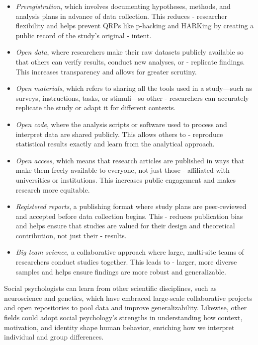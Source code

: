 \documentclass[
  letterpaper,
]{book}
\providecommand{\tightlist}{%
  \setlength{\itemsep}{0pt}\setlength{\parskip}{0pt}}\usepackage{longtable,booktabs,array}
\begin{document}
\begin{itemize}
\tightlist
\item
  \emph{Preregistration}, which involves documenting hypotheses,
  methods, and analysis plans in advance of data collection. This
  reduces - researcher flexibility and helps prevent QRPs like p-hacking
  and HARKing by creating a public record of the study's original -
  intent.
\item
  \emph{Open data}, where researchers make their raw datasets publicly
  available so that others can verify results, conduct new analyses, or
  - replicate findings. This increases transparency and allows for
  greater scrutiny.
\item
  \emph{Open materials}, which refers to sharing all the tools used in a
  study---such as surveys, instructions, tasks, or stimuli---so other -
  researchers can accurately replicate the study or adapt it for
  different contexts.
\item
  \emph{Open code}, where the analysis scripts or software used to
  process and interpret data are shared publicly. This allows others to
  - reproduce statistical results exactly and learn from the analytical
  approach.
\item
  \emph{Open access}, which means that research articles are published
  in ways that make them freely available to everyone, not just those -
  affiliated with universities or institutions. This increases public
  engagement and makes research more equitable.
\item
  \emph{Registered reports}, a publishing format where study plans are
  peer-reviewed and accepted before data collection begins. This -
  reduces publication bias and helps ensure that studies are valued for
  their design and theoretical contribution, not just their - results.
\item
  \emph{Big team science}, a collaborative approach where large,
  multi-site teams of researchers conduct studies together. This leads
  to - larger, more diverse samples and helps ensure findings are more
  robust and generalizable.
\end{itemize}

Social psychologists can learn from other scientific disciplines, such
as neuroscience and genetics, which have embraced large-scale
collaborative projects and open repositories to pool data and improve
generalizability. Likewise, other fields could adopt social psychology's
strengths in understanding how context, motivation, and identity shape
human behavior, enriching how we interpret individual and group
differences.
\end{document}
